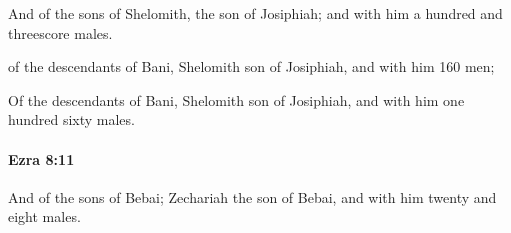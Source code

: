 			\begin{versebox}
					\item[BHS] 
					\item[LXX] 
					\item[ASV] And of the sons of Shelomith, the son of Josiphiah; and with him a hundred and threescore males.
					\item[NIV] of the descendants of Bani, Shelomith son of Josiphiah, and with him 160 men;
					\item[NRSV] Of the descendants of Bani, Shelomith son of Josiphiah, and with him one hundred sixty males.
			\end{versebox}

		\paragraph{Ezra 8:11} %
			\label{EZRA-8-11}

			And of the sons of Bebai; Zechariah the son of Bebai, and with him twenty and eight males.

